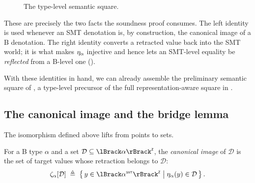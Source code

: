 \begin{figure}[t]
  \centering
  \caption{The type-level semantic square.}
  \label{fig:beer-type-semantic-square}
\end{figure}

These are precisely the two facts the soundness proof consumes.
The left identity is used whenever an SMT denotation is, by construction, the canonical image of a B denotation.
The right identity converts a retracted value back into the SMT world; it is what makes \(\eta_{\alpha}\) injective and hence lets an SMT-level equality be \emph{reflected} from a B-level one ().

With these identities in hand, we can already assemble the preliminary semantic square of , a type-level precursor of the full representation-aware square in .

\subsection{The canonical image and the bridge lemma}
\label{sec:beer-canonical-image}

The isomorphism defined above lifts from points to sets.

\begin{definition}
  \label{def:beer-canonical-image}
  For a B type \(\alpha\) and a set \(\mathcal{D} \subseteq \interpZ{\alpha}\), the \emph{canonical image} of \(\mathcal{D}\) is the set of target values whose retraction belongs to \(\mathcal{D}\):
  \[
    \regnotation{\cimg[\alpha]{\mathcal{D}}} \;\triangleq\; \left\{\, y \in \interpZ{\toSMT{\alpha}} \;\big|\; \retr{\alpha}(y) \in \mathcal{D} \,\right\}.
  \]
\end{definition}

